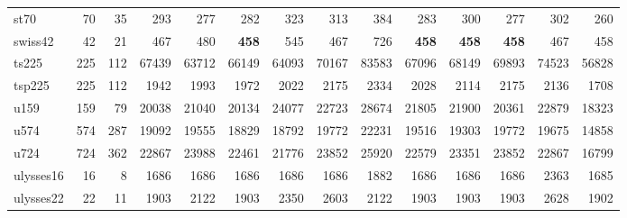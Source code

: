 {\begin{longtable}{l r r r r r r r r r r r r r}
st70 & 70 & 35 & 293 & 277 & 282 & 323 & 313 & 384 & 283 & 300 & 277 & 302 & 260 \\
swiss42 & 42 & 21 & 467 & 480 & \textbf{458} & 545 & 467 & 726 & \textbf{458} & \textbf{458} & \textbf{458} & 467 & 458 \\
ts225 & 225 & 112 & 67439 & 63712 & 66149 & 64093 & 70167 & 83583 & 67096 & 68149 & 69893 & 74523 & 56828 \\
tsp225 & 225 & 112 & 1942 & 1993 & 1972 & 2022 & 2175 & 2334 & 2028 & 2114 & 2175 & 2136 & 1708 \\
u159 & 159 & 79 & 20038 & 21040 & 20134 & 24077 & 22723 & 28674 & 21805 & 21900 & 20361 & 22879 & 18323 \\
u574 & 574 & 287 & 19092 & 19555 & 18829 & 18792 & 19772 & 22231 & 19516 & 19303 & 19772 & 19675 & 14858 \\
u724 & 724 & 362 & 22867 & 23988 & 22461 & 21776 & 23852 & 25920 & 22579 & 23351 & 23852 & 22867 & 16799 \\
ulysses16 & 16 & 8 & 1686 & 1686 & 1686 & 1686 & 1686 & 1882 & 1686 & 1686 & 1686 & 2363 & 1685 \\
ulysses22 & 22 & 11 & 1903 & 2122 & 1903 & 2350 & 2603 & 2122 & 1903 & 1903 & 1903 & 2628 & 1902 \\
\end{longtable}}